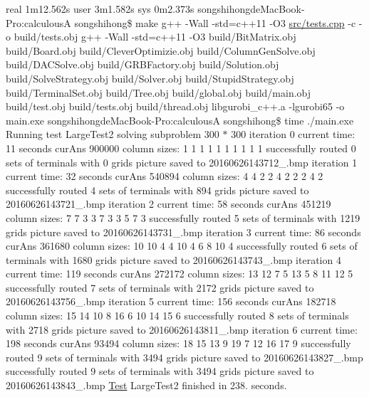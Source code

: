 real 1m12.\+562s user 3m1.\+582s sys 0m2.\+373s songshihongde\+Mac\+Book-\/\+Pro\+:calculousA songshihong\$ make g++ -\/\+Wall -\/std=c++11 -\/\+O3 \hyperlink{tests_8cpp}{src/tests.\+cpp} -\/c -\/o build/tests.\+obj g++ -\/\+Wall -\/std=c++11 -\/\+O3 build/\+Bit\+Matrix.\+obj build/\+Board.\+obj build/\+Clever\+Optimizie.\+obj build/\+Column\+Gen\+Solve.\+obj build/\+D\+A\+C\+Solve.\+obj build/\+G\+R\+B\+Factory.\+obj build/\+Solution.\+obj build/\+Solve\+Strategy.\+obj build/\+Solver.\+obj build/\+Stupid\+Strategy.\+obj build/\+Terminal\+Set.\+obj build/\+Tree.\+obj build/global.\+obj build/main.\+obj build/test.\+obj build/tests.\+obj build/thread.\+obj libgurobi\+\_\+c++.a -\/lgurobi65 -\/o main.\+exe songshihongde\+Mac\+Book-\/\+Pro\+:calculousA songshihong\$ time ./main.exe Running test Large\+Test2 solving subproblem 300 $\ast$ 300 iteration 0 current time\+: 11 seconds cur\+Ans 900000 column sizes\+: 1 1 1 1 1 1 1 1 1 1 successfully routed 0 sets of terminals with 0 grids picture saved to 20160626143712\+\_.\+bmp iteration 1 current time\+: 32 seconds cur\+Ans 540894 column sizes\+: 4 4 2 2 4 2 2 2 4 2 successfully routed 4 sets of terminals with 894 grids picture saved to 20160626143721\+\_.\+bmp iteration 2 current time\+: 58 seconds cur\+Ans 451219 column sizes\+: 7 7 3 3 7 3 3 5 7 3 successfully routed 5 sets of terminals with 1219 grids picture saved to 20160626143731\+\_.\+bmp iteration 3 current time\+: 86 seconds cur\+Ans 361680 column sizes\+: 10 10 4 4 10 4 6 8 10 4 successfully routed 6 sets of terminals with 1680 grids picture saved to 20160626143743\+\_.\+bmp iteration 4 current time\+: 119 seconds cur\+Ans 272172 column sizes\+: 13 12 7 5 13 5 8 11 12 5 successfully routed 7 sets of terminals with 2172 grids picture saved to 20160626143756\+\_.\+bmp iteration 5 current time\+: 156 seconds cur\+Ans 182718 column sizes\+: 15 14 10 8 16 6 10 14 15 6 successfully routed 8 sets of terminals with 2718 grids picture saved to 20160626143811\+\_.\+bmp iteration 6 current time\+: 198 seconds cur\+Ans 93494 column sizes\+: 18 15 13 9 19 7 12 16 17 9 successfully routed 9 sets of terminals with 3494 grids picture saved to 20160626143827\+\_.\+bmp successfully routed 9 sets of terminals with 3494 grids picture saved to 20160626143843\+\_.\+bmp \hyperlink{classTest}{Test} Large\+Test2 finished in 238. seconds.

